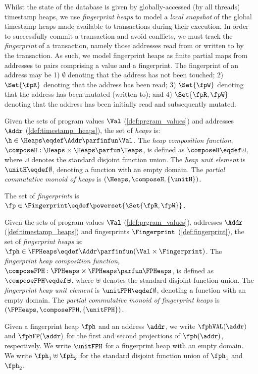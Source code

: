 Whilst the state of the database is given by globally-accessed (by all threads) timestamp heaps, we use \emph{fingerprint heaps} to model a \emph{local snapshot} of the global timestamp heaps made available to transactions during their execution. 
In order to successfully commit a transaction and avoid conflicts, we must track the \emph{fingerprint} of a transaction, namely those addresses read from or written to by the transaction.
As such, we model fingerprint heaps as finite partial maps from addresses to pairs comprising a value and a fingerprint.
The fingerprint of an address may be 1) $\emptyset$ denoting that the address has not been touched;
2) $\Set{\fpR}$ denoting that the address has been read;
3) $\Set{\fpW}$ denoting that the address has been mutated (written to);
and 4) $\Set{\fpR, \fpW}$ denoting that the address has been initially read and subsequently mutated.   
%
%
\begin{definition}[Heaps]\label{def:heaps}
Given the sets of program values $\Val$ (\ref{def:prgram_values}) and  addresses $\Addr$ (\ref{def:timestamp_heaps}), the set of \emph{ heaps} is: $\h \in \Heaps \eqdef \Addr \parfinfun \Val$.
The \emph{heap composition function}, $\composeH: \Heaps \times \Heaps \parfun \Heaps$, is defined as $\composeH \eqdef \uplus$, where $\uplus$ denotes the standard disjoint function union. The \emph{ heap unit element} is $\unitH \eqdef \emptyset$, denoting a function with an empty domain.
The \emph{partial commutative monoid of  heaps} is $(\Heaps, \composeH, \{\unitH\})$.
\end{definition}
%
\begin{defn}[Fingerprints]
\label{def:fingerprint}
The set of \emph{fingerprints} is $\fp \in \Fingerprint \eqdef \powerset{\Set{\fpR,\fpW}}$.
\end{defn}
%
\begin{defn}
\label{def:fingerprint_heaps}
Given the sets of program values $\Val$ (\ref{def:prgram_values}), addresses $\Addr$ (\ref{def:timestamp_heaps}) and fingerprints $\Fingerprint$ (\ref{def:fingerprint}), the set of \emph{fingerprint heaps} is: $\fph \in \FPHeaps \eqdef \Addr \parfinfun (\Val \times \Fingerprint)$.
The \emph{fingerprint heap composition function}, $\composeFPH: \FPHeaps \times \FPHeaps \parfun \FPHeaps$, is defined as $\composeFPH \eqdef \uplus$, where $\uplus$ denotes the standard disjoint function union. The \emph{fingerprint heap unit element} is $\unitFPH \eqdef \emptyset$, denoting a function with an empty domain.
The \emph{partial commutative monoid of fingerprint heaps} is $(\FPHeaps, \composeFPH, \{\unitFPH\})$.  
\end{defn}
%
Given a fingerprint heap $\fph$ and an address $\addr$, we write $\fphVAL(\addr)$ and $\fphFP(\addr)$ for the first and second projections of $\fph(\addr)$, respectively. We write $\unitFPH$ for a fingerprint heap with an empty domain. We write $\fph_1 \uplus \fph_2$ for the standard disjoint function union of $\fph_1$ and $\fph_2$. 

